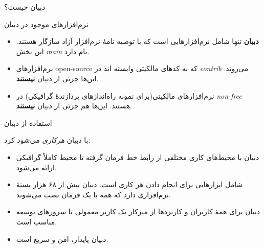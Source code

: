 \documentclass[hyperref={colorlinks}]{beamer}
\begin{document}
\begin{persian}

\begin{frame}{دبیان چیست؟}
\begin{block}{نرم‌افزارهای موجود در دبیان}
	\begin{itemize}
		\item \textbf{دبیان} تنها شامل نرم‌افزارهایی است که با توصیه نامهٔ نرم‌افزار آزاد سازگار هستند. این بخش \emph{main} نام دارد.
		\item 
نرم‌افزارهای open-source که به کدهای مالکیتی وابسته اند در \emph{contrib} می‌روند. این‌ها جزئی از دبیان \textbf{نیستند}.		

		\item 
نرم‌افزارهای مالکیتی(برای نمونه راه‌اندازهای پردازندهٔ گرافیکی) در \emph{non-free} هستند. این‌ها هم جزئی از دبیان \textbf{نیستند}.
		
	\end{itemize}
\end{block}
\end{frame}

\end{persian}

\begin{persian}
	
\begin{frame}{استفاده از دبیان}
\begin{block}{با دبیان \emph{هرکاری}  می‌شود کرد:}
\begin{itemize}
	\item 
دبیان با محیط‌های کاری مختلفی از رابط خط فرمان گرفته تا محیط کاملاً گرافیکی ارائه می‌شود.	

	\item
شامل ابزارهایی برای انجام دادن هر کاری است.
دبیان بیش از ۶۸ هزار بسته‌ٔ نرم‌افزاری دارد که همه با یک فرمان نصب می‌شوند.
	
	\item
دبیان برای همهٔ کاربران و کاربردها از میزکار یک کاربر معمولی تا سرورهای توسعه مناسب است.	
	
	\item
دبیان پایدار، امن و سریع است.
	
\end{itemize}
\end{block}
\end{frame}
\end{persian}
\end{document}
